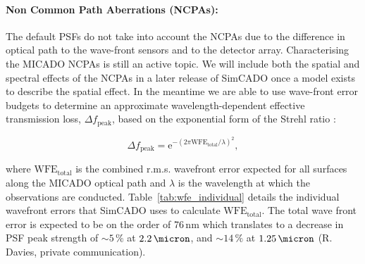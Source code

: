 \paragraph{Non Common Path Aberrations (NCPAs):} The default PSFs do not take into account the NCPAs due to the difference in optical path to the wave-front sensors and to the detector array. Characterising the MICADO NCPAs is still an active topic. We will include both the spatial and spectral effects of the NCPAs in a later release of SimCADO once a model exists to describe the spatial effect. In the meantime we are able to use wave-front error budgets to determine an approximate wavelength-dependent effective transmission loss, $\Delta f_{\mathrm{peak}}$, based on the exponential form of the Strehl ratio \citep{mahajan1991}:

\begin{equation}
    \Delta f_{\mathrm{peak}} = \mathrm{e}^{-(2\pi \mathrm{WFE}_{\mathrm{total}}/\lambda)^2},
    \label{eq:wfe}
\end{equation}

where $\mathrm{WFE}_{\mathrm{total}}$ is the combined r.m.s. wavefront error expected for all surfaces along the MICADO optical path and $\lambda$ is the wavelength at which the observations are conducted. Table~\ref{tab:wfe_individual} details the individual wavefront errors that SimCADO uses to calculate $\mathrm{WFE}_{\mathrm{total}}$. The total wave front error is expected to be on the order of 76\,nm which translates to a decrease in PSF peak strength of $\sim 5\,\%$ at $2.2\,\micron$, and $\sim 14\,\%$ at $1.25\,\micron$ (R. Davies, private communication).


